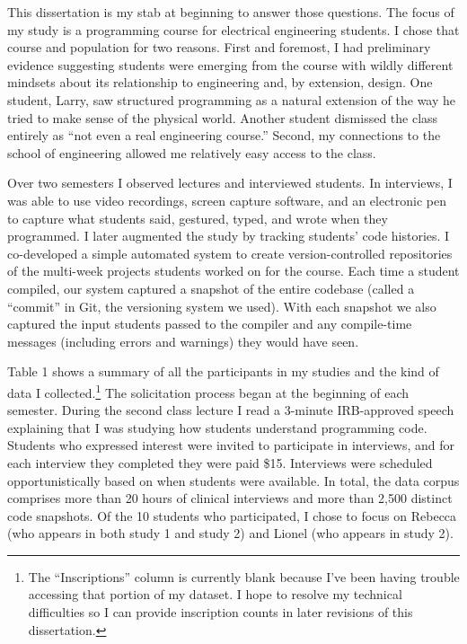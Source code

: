 This dissertation is my stab at beginning to answer those questions. The focus of my study is a programming course for electrical engineering students. I chose that course and population for two reasons. First and foremost, I had preliminary evidence suggesting students were emerging from the course with wildly different mindsets about its relationship to engineering and, by extension, design. One student, Larry, saw structured programming as a natural extension of the way he tried to make sense of the physical world. Another student dismissed the class entirely as ``not even a real engineering course.'' Second, my connections to the school of engineering allowed me relatively easy access to the class.

Over two semesters I observed lectures and interviewed students. In interviews, I was able to use video recordings, screen capture software, and an electronic pen to capture what students said, gestured, typed, and wrote when they programmed. I later augmented the study by tracking students' code histories. I co-developed a simple automated system to create version-controlled repositories of the multi-week projects students worked on for the course. Each time a student compiled, our system captured a snapshot of the entire codebase (called a ``commit'' in Git, the versioning system we used). With each snapshot we also captured the input students passed to the compiler and any compile-time messages (including errors and warnings) they would have seen.

Table 1 shows a summary of all the participants in my studies and the kind of data I collected.\footnote{The ``Inscriptions'' column is currently blank because I've been having trouble accessing that portion of my dataset. I hope to resolve my technical difficulties so I can provide inscription counts in later revisions of this dissertation.} The solicitation process began at the beginning of each semester. During the second class lecture I read a 3-minute IRB-approved speech explaining that I was studying how students understand programming code. Students who expressed interest were invited to participate in interviews, and for each interview they completed they were paid \$15. Interviews were scheduled opportunistically based on when students were available. In total, the data corpus comprises more than 20 hours of clinical interviews and more than 2,500 distinct code snapshots. Of the 10 students who participated, I chose to focus on Rebecca (who appears in both study 1 and study 2) and Lionel (who appears in study 2).

